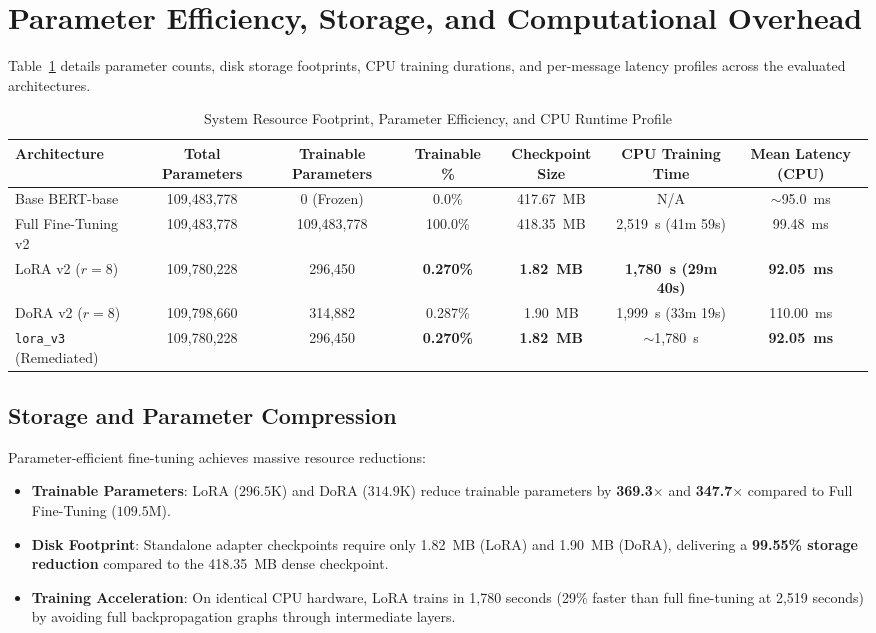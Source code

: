 \documentclass[conference]{IEEEtran}
\begin{document}
\section{Parameter Efficiency, Storage, and Computational Overhead}
\label{sec:efficiency}

Table~\ref{tab:efficiency_profile} details parameter counts, disk storage footprints, CPU training durations, and per-message latency profiles across the evaluated architectures.

\begin{table}[t]
\caption{System Resource Footprint, Parameter Efficiency, and CPU Runtime Profile}
\label{tab:efficiency_profile}
\centering
\begin{tabularx}{\textwidth}{lcccccc}
\toprule
\textbf{Architecture} & \textbf{Total Parameters} & \textbf{Trainable Parameters} & \textbf{Trainable \%} & \textbf{Checkpoint Size} & \textbf{CPU Training Time} & \textbf{Mean Latency (CPU)} \\
\midrule
Base BERT-base & 109,483,778 & 0 (Frozen) & 0.0\% & 417.67~MB & N/A & $\sim$95.0~ms \\
Full Fine-Tuning v2 & 109,483,778 & 109,483,778 & 100.0\% & 418.35~MB & 2,519~s (41m 59s) & 99.48~ms \\
LoRA v2 ($r=8$) & 109,780,228 & 296,450 & \textbf{0.270\%} & \textbf{1.82~MB} & \textbf{1,780~s (29m 40s)} & \textbf{92.05~ms} \\
DoRA v2 ($r=8$) & 109,798,660 & 314,882 & 0.287\% & 1.90~MB & 1,999~s (33m 19s) & 110.00~ms \\
\midrule
\texttt{lora\_v3} (Remediated) & 109,780,228 & 296,450 & \textbf{0.270\%} & \textbf{1.82~MB} & $\sim$1,780~s & \textbf{92.05~ms} \\
\bottomrule
\end{tabularx}
\end{table}

\subsection{Storage and Parameter Compression}
Parameter-efficient fine-tuning achieves massive resource reductions:
\begin{itemize}
    \item \textbf{Trainable Parameters}: LoRA ($296.5\text{K}$) and DoRA ($314.9\text{K}$) reduce trainable parameters by \textbf{369.3$\times$} and \textbf{347.7$\times$} compared to Full Fine-Tuning ($109.5\text{M}$).
    \item \textbf{Disk Footprint}: Standalone adapter checkpoints require only 1.82~MB (LoRA) and 1.90~MB (DoRA), delivering a \textbf{99.55\% storage reduction} compared to the 418.35~MB dense checkpoint.
    \item \textbf{Training Acceleration}: On identical CPU hardware, LoRA trains in 1,780 seconds (29\% faster than full fine-tuning at 2,519 seconds) by avoiding full backpropagation graphs through intermediate layers.
\end{itemize}
\end{document}
